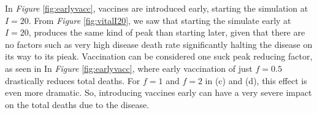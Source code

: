 In \textit{Figure} \ref{fig:earlyvacc}, vaccines are introduced early, starting the simulation at $I=20$. 
From \textit{Figure} \ref{fig:vitalI20}, we saw that starting the simulate early at $I=20$, produces the same kind of peak than starting later, given that there are no factors such as very high disease death rate significantly halting the disease on its way to its pieak.
Vaccination can be considered one suck peak reducing factor, as seen in In \textit{Figure} \ref{fig:earlyvacc}, where early vaccination of just $f=0.5$ drastically reduces total deaths.
For $f=1$ and $f=2$ in (c) and (d), this effect is even more dramatic. So, introducing vaccines early can have a very severe impact on the total deaths due to the disease.
\begin{figure}[H]
    \centering
    \\

\end{figure}
